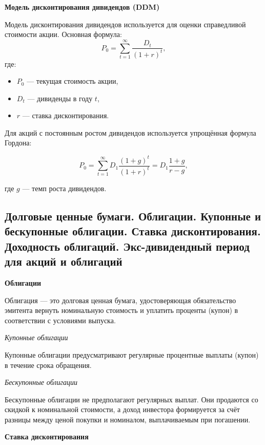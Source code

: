 \textbf{Модель дисконтирования дивидендов (DDM)}

Модель дисконтирования дивидендов используется для оценки справедливой стоимости акции. Основная формула:
\begin{equation}
    P_0 = \sum_{t=1}^{\infty} \frac{D_t}{(1 + r)^t},
\end{equation}
\noindent где:
\begin{itemize}
    \item $P_0$ --- текущая стоимость акции,
    \item $D_t$ --- дивиденды в году $t$,
    \item $r$ --- ставка дисконтирования.
\end{itemize}

Для акций с постоянным ростом дивидендов используется упрощённая формула Гордона:

\begin{equation}
    P_0 = \sum_{t=1}^{\infty} D_1 \frac{(1 + g)^t}{(1 + r)^t} = D_1 \frac{1+g}{r-g},
\end{equation}

\noindent где $g$ --- темп роста дивидендов.


\pagebreak
\subsection{Долговые ценные бумаги. Облигации. Купонные и бескупонные облигации. Ставка дисконтирования. Доходность облигаций. Экс-дивидендный период для акций и облигаций}

\textbf{Облигации}

Облигация --- это долговая ценная бумага, удостоверяющая обязательство эмитента вернуть номинальную стоимость и уплатить проценты (купон) в соответствии с условиями выпуска.

\textit{Купонные облигации}

Купонные облигации предусматривают регулярные процентные выплаты (купон) в течение срока обращения.

\textit{Бескупонные облигации}

Бескупонные облигации не предполагают регулярных выплат. Они продаются со скидкой к номинальной стоимости, а доход инвестора формируется за счёт разницы между ценой покупки и номиналом, выплачиваемым при погашении.

\textbf{Ставка дисконтирования}

